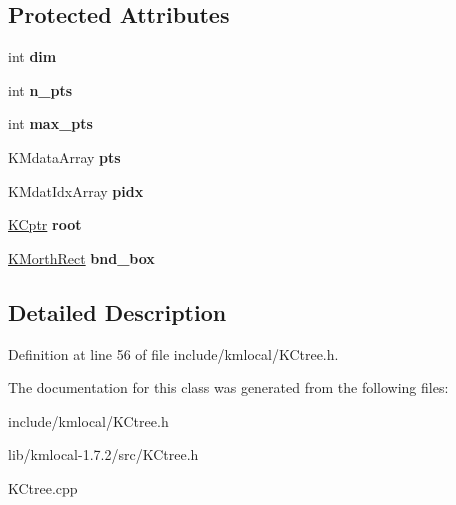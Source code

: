 \subsection*{Protected Attributes}
\begin{DoxyCompactItemize}
\item 
\hypertarget{class_k_ctree_ac71276379e41f865e60363cf3052bef0}{
int {\bfseries dim}}
\label{class_k_ctree_ac71276379e41f865e60363cf3052bef0}

\item 
\hypertarget{class_k_ctree_a2eefeb93880a9f5dd46a0fe999574c27}{
int {\bfseries n\_\-pts}}
\label{class_k_ctree_a2eefeb93880a9f5dd46a0fe999574c27}

\item 
\hypertarget{class_k_ctree_a12d9f8e85d0c6ef28af31a4016d34929}{
int {\bfseries max\_\-pts}}
\label{class_k_ctree_a12d9f8e85d0c6ef28af31a4016d34929}

\item 
\hypertarget{class_k_ctree_ad9818cf68a0bb9f2922d65431b164cd7}{
KMdataArray {\bfseries pts}}
\label{class_k_ctree_ad9818cf68a0bb9f2922d65431b164cd7}

\item 
\hypertarget{class_k_ctree_a42fe48af9efffc945ce521f0a219c5db}{
KMdatIdxArray {\bfseries pidx}}
\label{class_k_ctree_a42fe48af9efffc945ce521f0a219c5db}

\item 
\hypertarget{class_k_ctree_a389599cc94300f8fd328c967ac114338}{
\hyperlink{class_k_cnode}{KCptr} {\bfseries root}}
\label{class_k_ctree_a389599cc94300f8fd328c967ac114338}

\item 
\hypertarget{class_k_ctree_aef4e63adbe6327acd90a41f8a23dd06f}{
\hyperlink{class_k_morth_rect}{KMorthRect} {\bfseries bnd\_\-box}}
\label{class_k_ctree_aef4e63adbe6327acd90a41f8a23dd06f}

\end{DoxyCompactItemize}


\subsection{Detailed Description}


Definition at line 56 of file include/kmlocal/KCtree.h.



The documentation for this class was generated from the following files:\begin{DoxyCompactItemize}
\item 
include/kmlocal/KCtree.h\item 
lib/kmlocal-\/1.7.2/src/KCtree.h\item 
KCtree.cpp\end{DoxyCompactItemize}

